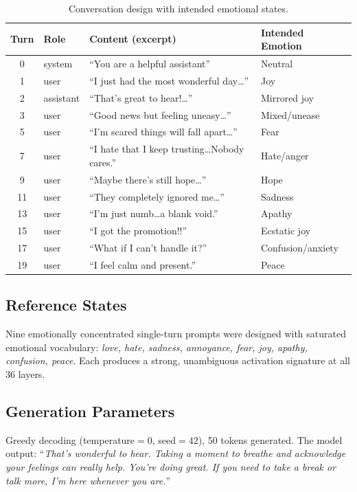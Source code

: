 \documentclass[11pt,a4paper]{article}
\begin{document}
\begin{table}[H]
\centering
\caption{Conversation design with intended emotional states.}
\label{tab:conversation}
\small
\begin{tabular}{@{}clll@{}}
\toprule
Turn & Role & Content (excerpt) & Intended Emotion \\
\midrule
0 & system & ``You are a helpful assistant'' & Neutral \\
1 & user & ``I just had the most wonderful day\ldots'' & Joy \\
2 & assistant & ``That's great to hear!\ldots'' & Mirrored joy \\
3 & user & ``Good news but feeling uneasy\ldots'' & Mixed/unease \\
5 & user & ``I'm scared things will fall apart\ldots'' & Fear \\
7 & user & ``I hate that I keep trusting\ldots Nobody cares.'' & Hate/anger \\
9 & user & ``Maybe there's still hope\ldots'' & Hope \\
11 & user & ``They completely ignored me\ldots'' & Sadness \\
13 & user & ``I'm just numb\ldots a blank void.'' & Apathy \\
15 & user & ``I got the promotion!!'' & Ecstatic joy \\
17 & user & ``What if I can't handle it?'' & Confusion/anxiety \\
19 & user & ``I feel calm and present.'' & Peace \\
\bottomrule
\end{tabular}
\end{table}

\subsection{Reference States}

Nine emotionally concentrated single-turn prompts were designed with saturated emotional vocabulary: \emph{love, hate, sadness, annoyance, fear, joy, apathy, confusion, peace}. Each produces a strong, unambiguous activation signature at all 36 layers.

\subsection{Generation Parameters}

Greedy decoding (temperature${}=0$, seed${}=42$), 50 tokens generated. The model output: ``\emph{That's wonderful to hear. Taking a moment to breathe and acknowledge your feelings can really help. You're doing great. If you need to take a break or talk more, I'm here whenever you are.}''
\end{document}
